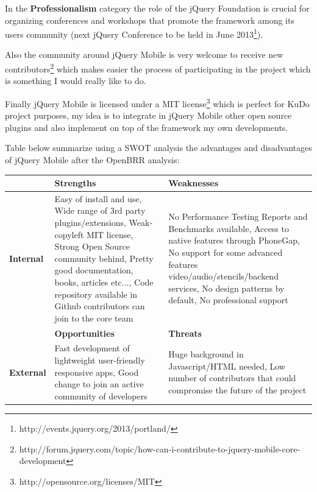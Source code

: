 \documentclass[a4paper,12pt]{book}
\begin{document}
In the \textbf{Professionalism} category the role of the jQuery Foundation is crucial for organizing conferences and workshops that promote the framework among its users community (next jQuery Conference to be held in June 2013\footnote{http://events.jquery.org/2013/portland/}).

Also the community around jQuery Mobile is very welcome to receive new contributors\footnote{http://forum.jquery.com/topic/how-can-i-contribute-to-jquery-mobile-core-development} which makes easier the process of participating in the project which is something I would really like to do.

Finally jQuery Mobile is licensed under a MIT license\footnote{http://opensource.org/licenses/MIT} which is perfect for KuDo project purposes, my idea is to integrate in jQuery Mobile other open source plugins and also implement on top of the framework my own developments.

Table below summarize using a SWOT analysis the advantages and disadvantages of jQuery Mobile after the OpenBRR analysis:

\begin{center}
    \begin{tabular}{ | p{1.7cm} | p{6cm} | p{6cm} |}
    \hline
    & \textbf{Strengths} & \textbf{Weaknesses} \\ \hline
    \textbf{Internal} & 
    Easy of install and use, %
    Wide range of 3rd party plugins/extensions,
    Weak-copyleft MIT license,
    Strong Open Source community behind,
    Pretty good documentation, books, articles etc...,
    Code repository available in Github contributors can join to the core team
    & No Performance Testing Reports and Benchmarks available, %
    Access to native features through PhoneGap, 
    No support for some advanced features video/audio/stencils/backend services,
    No design patterns by default,
    No professional support\\ \hline
    & \textbf{Opportunities} & \textbf{Threats} \\ \hline
    \textbf{External}  
    & Fast development of lightweight user-friendly responsive apps, %
    Good change to join an active community of developers
    & Huge background in Javascript/HTML needed, %
    Low number of contributors that could compromise the future of the project\\ \hline
    \end{tabular}
\end{center}
\end{document}
